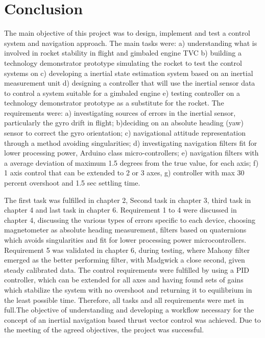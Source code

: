 \chapter{Conclusion}

The main objective of this project was to design, implement and test a control system and navigation approach. The main tasks were:
a) understanding what is involved in rocket stability in flight and gimbaled engine TVC
b) building a technology demonstrator prototype simulating the rocket to test the control systems on
c) developing a inertial state estimation system based on an inertial measurement unit
d) designing a controller that will use the inertial sensor data to control a system suitable for a gimbaled engine
e) testing controller on a technology demonstrator prototype as a substitute for the rocket.
The requirements were: a) investigating sources of errors in the inertial sensor, particularly the gyro drift in flight; b)deciding on an absolute heading (yaw) sensor to correct the gyro orientation; c) navigational attitude representation through a method avoiding singularities; d) investigating navigation filters fit for lower processing power, Arduino class micro-controllers; e) navigation filters with a average deviation of maximum 1.5 degrees from the true value, for each axis; f) 1 axis control that can be extended to 2 or 3 axes, g) controller with max 30 percent overshoot and 1.5 sec settling time.


The first task was fulfilled in chapter 2, 
Second task in chapter 3, 
third task in chapter 4 
and last task in chapter 6. 
Requirement 1 to 4 were discussed in chapter 4, discussing the various types of errors specific to each device, choosing magnetometer as absolute heading measurement, filters based on quaternions which avoids singularities and fit for lower processing power microcontrollers. 
Requirement 5 was validated in chapter 6, during testing, where Mahony filter emerged as the better performing filter, with Madgwick a close second, given steady calibrated data. 
The control requirements were fulfilled by using a PID controller, which can be extended for all axes and having found sets of gains which stabilize the system with no overshoot and returning it to equilibrium in the least possible time. 
Therefore, all tasks and all requirements were met in full.The objective of understanding and developing a workflow necessary for the concept of an inertial navigation based thrust vector control was achieved.
Due to the meeting of the agreed objectives, the project was successful. 
